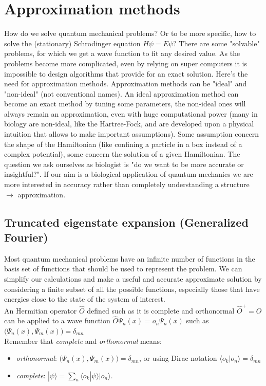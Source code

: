 \graphicspath{{chapters/05/}}
\chapter{Approximation methods}
How do we solve quantum mechanical problems? Or to be more specific, how to solve the (stationary) Schrodinger equation $ H \psi = E \psi$? There are some "solvable" problems, for which we get a wave function to fit any desired value. As the problems become more complicated, even by relying on super computers it is impossible to design algorithms that provide for an exact solution. Here's the need for approximation methods. Approximation methods can be "ideal" and "non-ideal" (not conventional names). An ideal approximation method can become an exact method by tuning some parameters, the non-ideal ones will always remain an approximation, even with huge computational power (many in biology are non-ideal, like the Hartree-Fock, and are developed upon a physical intuition that allows to make important assumptions).
Some assumption concern the shape of the Hamiltonian (like confining a particle in a box instead of a complex potential), some concern the solution of a given Hamiltonian.
The question we ask ourselves as biologist is "do we want to be more accurate or insightful?". If our aim is a biological application of quantum mechanics we are more interested in accuracy rather than completely understanding a structure $\rightarrow$ approximation.
\section{Truncated eigenstate expansion (Generalized Fourier)}
Most quantum mechanical problems have an infinite number of functions in the basis set of functions that should be used to represent the problem. We can simplify our calculations and make a useful and accurate approximate solution by considering a finite subset of all the possible functions, especially those that have energies close to the state of the system of interest.\\
An Hermitian operator $\hat{O}$ defined such as it is complete and orthonormal $\hat{O}^+=\hat{O}$ can be applied to a wave function $\hat{O}\Psi_n(x)=o_n\Psi_n(x)$ such as $\bigl(\Psi_n(x),\Psi_m(x)\bigr)=\delta_{mn}$\\
Remember that \textit{complete} and \textit{orthonormal} means:
\begin{itemize}
\item \textit{orthonormal}: $\bigl(\Psi_n(x),\Psi_m(x)\bigr)=\delta_{mn}$, or using Dirac notation $\langle o_k|o_n \rangle = \delta_{mn}$
\item \textit{complete}: $ | \psi \rangle = \sum_n \langle o_k | \psi \rangle |o_n \rangle$.
\end{itemize}

